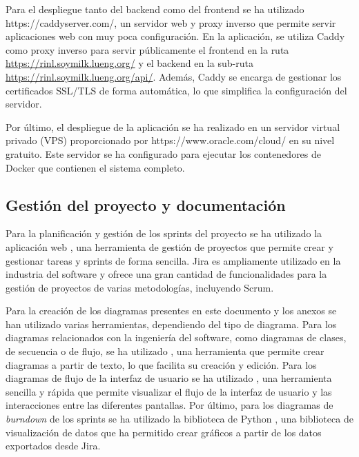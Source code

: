 Para el despliegue tanto del \gls{backend} como del \gls{frontend} se ha
utilizado  {https://caddyserver.com/}, un servidor web y proxy
inverso que permite servir aplicaciones web con muy poca configuración. En la
aplicación, se utiliza Caddy como proxy inverso para servir públicamente el
\gls{frontend} en la ruta \url{https://rinl.soymilk.lueng.org/} y el
\gls{backend} en la sub-ruta \url{https://rinl.soymilk.lueng.org/api/}. Además,
Caddy se encarga de gestionar los certificados SSL/TLS de forma automática, lo
que simplifica la configuración del servidor.

Por último, el despliegue de la aplicación se ha realizado en un servidor
virtual privado (VPS) proporcionado por 
{https://www.oracle.com/cloud/} en su nivel gratuito. Este servidor se ha
configurado para ejecutar los contenedores de Docker que contienen el sistema
completo.

\subsection{Gestión del proyecto y documentación}
\label{sec:gestion-proyecto}
Para la planificación y gestión de los sprints del proyecto se ha utilizado la
aplicación web , una
herramienta de gestión de proyectos que permite crear y gestionar tareas y
sprints de forma sencilla. Jira es ampliamente utilizado en la industria del
software y ofrece una gran cantidad de funcionalidades para la gestión de
proyectos de varias metodologías, incluyendo Scrum.

Para la creación de los diagramas presentes en este documento y los anexos se
han utilizado varias herramientas, dependiendo del tipo de diagrama. Para los
diagramas relacionados con la ingeniería del software, como diagramas de clases,
de secuencia o de flujo, se ha utilizado ,
una herramienta que permite crear diagramas a partir de texto, lo que facilita
su creación y edición. Para los diagramas de flujo de la interfaz de usuario se
ha utilizado , una herramienta sencilla
y rápida que permite visualizar el flujo de la interfaz de usuario y las
interacciones entre las diferentes pantallas. Por último, para los diagramas de
\textit{burndown} de los sprints se ha utilizado la biblioteca de Python
, una biblioteca de visualización de
datos que ha permitido crear gráficos a partir de los datos exportados desde
Jira.

